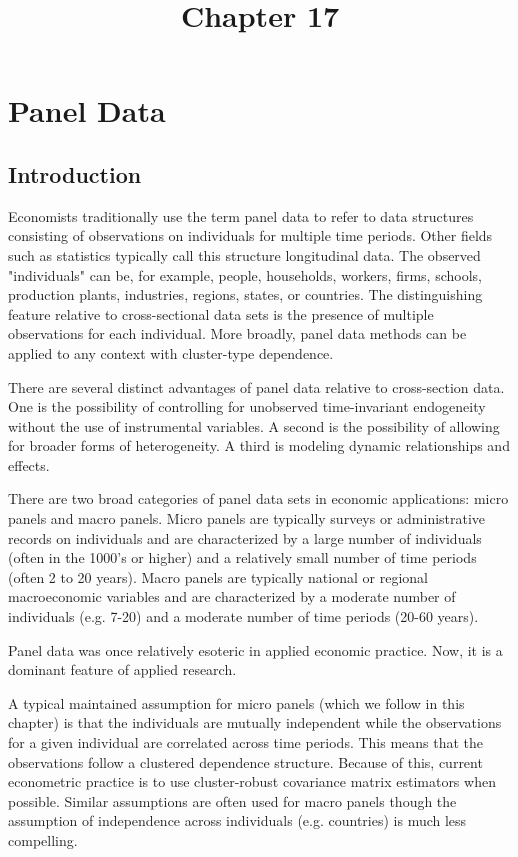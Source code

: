 \documentclass[10pt]{article}
\title{Chapter 17 }
\author{}
\date{}
\begin{document}
\maketitle
\section{Panel Data}
\subsection{Introduction}
Economists traditionally use the term panel data to refer to data structures consisting of observations on individuals for multiple time periods. Other fields such as statistics typically call this structure longitudinal data. The observed "individuals" can be, for example, people, households, workers, firms, schools, production plants, industries, regions, states, or countries. The distinguishing feature relative to cross-sectional data sets is the presence of multiple observations for each individual. More broadly, panel data methods can be applied to any context with cluster-type dependence.

There are several distinct advantages of panel data relative to cross-section data. One is the possibility of controlling for unobserved time-invariant endogeneity without the use of instrumental variables. A second is the possibility of allowing for broader forms of heterogeneity. A third is modeling dynamic relationships and effects.

There are two broad categories of panel data sets in economic applications: micro panels and macro panels. Micro panels are typically surveys or administrative records on individuals and are characterized by a large number of individuals (often in the 1000's or higher) and a relatively small number of time periods (often 2 to 20 years). Macro panels are typically national or regional macroeconomic variables and are characterized by a moderate number of individuals (e.g. 7-20) and a moderate number of time periods (20-60 years).

Panel data was once relatively esoteric in applied economic practice. Now, it is a dominant feature of applied research.

A typical maintained assumption for micro panels (which we follow in this chapter) is that the individuals are mutually independent while the observations for a given individual are correlated across time periods. This means that the observations follow a clustered dependence structure. Because of this, current econometric practice is to use cluster-robust covariance matrix estimators when possible. Similar assumptions are often used for macro panels though the assumption of independence across individuals (e.g. countries) is much less compelling.
\end{document}
